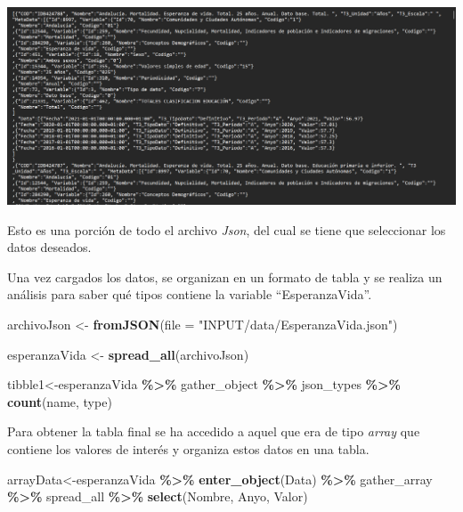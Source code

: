 \documentclass[
]{article}
\newenvironment{Shaded}{\begin{snugshade}}{\end{snugshade}}
\newcommand{\AttributeTok}[1]{\textcolor[rgb]{0.13,0.29,0.53}{#1}}
\newcommand{\FunctionTok}[1]{\textcolor[rgb]{0.13,0.29,0.53}{\textbf{#1}}}
\newcommand{\NormalTok}[1]{#1}
\newcommand{\OtherTok}[1]{\textcolor[rgb]{0.56,0.35,0.01}{#1}}
\newcommand{\SpecialCharTok}[1]{\textcolor[rgb]{0.81,0.36,0.00}{\textbf{#1}}}
\newcommand{\StringTok}[1]{\textcolor[rgb]{0.31,0.60,0.02}{#1}}
\begin{document}
\includegraphics{INPUT/images/EsperanzadeVidaJson.png}

Esto es una porción de todo el archivo \emph{Json}, del cual se tiene
que seleccionar los datos deseados.

Una vez cargados los datos, se organizan en un formato de tabla y se
realiza un análisis para saber qué tipos contiene la variable
``EsperanzaVida''.

\begin{Shaded}
\begin{Highlighting}[]
\NormalTok{archivoJson }\OtherTok{\textless{}{-}} \FunctionTok{fromJSON}\NormalTok{(}\AttributeTok{file =} \StringTok{"INPUT/data/EsperanzaVida.json"}\NormalTok{)}

\NormalTok{esperanzaVida }\OtherTok{\textless{}{-}} \FunctionTok{spread\_all}\NormalTok{(archivoJson)}

\NormalTok{tibble1}\OtherTok{\textless{}{-}}\NormalTok{esperanzaVida }\SpecialCharTok{\%\textgreater{}\%} 
\NormalTok{  gather\_object }\SpecialCharTok{\%\textgreater{}\%}  
\NormalTok{  json\_types }\SpecialCharTok{\%\textgreater{}\%} 
  \FunctionTok{count}\NormalTok{(name, type)}
\end{Highlighting}
\end{Shaded}

Para obtener la tabla final se ha accedido a aquel que era de tipo
\emph{array} que contiene los valores de interés y organiza estos datos
en una tabla.

\begin{Shaded}
\begin{Highlighting}[]
\NormalTok{arrayData}\OtherTok{\textless{}{-}}\NormalTok{esperanzaVida }\SpecialCharTok{\%\textgreater{}\%}
  \FunctionTok{enter\_object}\NormalTok{(Data) }\SpecialCharTok{\%\textgreater{}\%} 
\NormalTok{  gather\_array }\SpecialCharTok{\%\textgreater{}\%} 
\NormalTok{  spread\_all }\SpecialCharTok{\%\textgreater{}\%} 
  \FunctionTok{select}\NormalTok{(Nombre, Anyo, Valor) }
\end{Highlighting}
\end{Shaded}
\end{document}
